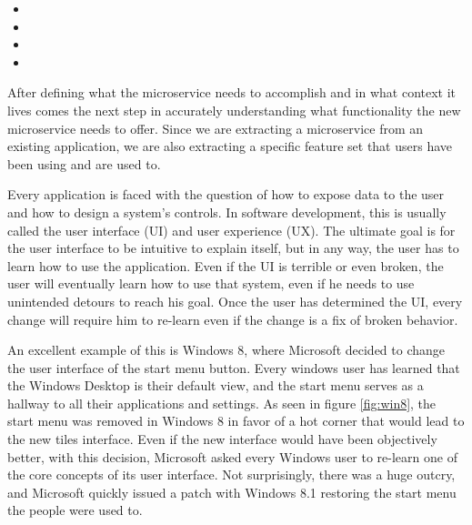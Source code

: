 \begin{itemize}
  \item {}
  \item {}
  \item {}
  \item {}
\end{itemize}

After defining what the microservice needs to accomplish and in what context it lives comes the next step in accurately understanding what functionality the new microservice needs to offer. Since we are extracting a microservice from an existing application, we are also extracting a specific feature set that users have been using and are used to.

Every application is faced with the question of how to expose data to the user and how to design a system's controls. In software development, this is usually called the user interface (UI) and user experience (UX). The ultimate goal is for the user interface to be intuitive to explain itself, but in any way, the user has to learn how to use the application. Even if the UI is terrible or even broken, the user will eventually learn how to use that system, even if he needs to use unintended detours to reach his goal. Once the user has determined the UI, every change will require him to re-learn even if the change is a fix of broken behavior.

An excellent example of this is Windows 8, where Microsoft decided to change the user interface of the start menu button. Every windows user has learned that the Windows Desktop is their default view, and the start menu serves as a hallway to all their applications and settings. As seen in figure \ref{fig:win8}, the start menu was removed in Windows 8 in favor of a hot corner that would lead to the new tiles interface. Even if the new interface would have been objectively better, with this decision, Microsoft asked every Windows user to re-learn one of the core concepts of its user interface. Not surprisingly, there was a huge outcry, and Microsoft quickly issued a patch with Windows 8.1 restoring the start menu the people were used to.

